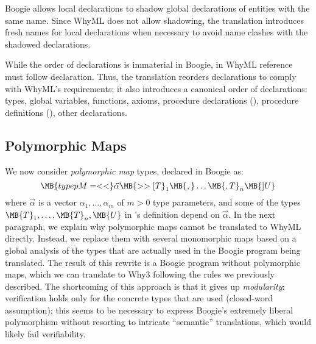 \documentclass[a4paper,final]{llncs}
\newcommand{\Boogie}{Boogie\xspace}
\newcommand{\WhyML}{WhyML\xspace}
\newcommand{\Why}{Why3\xspace}
\newcommand{\feature}[1]{\subsection{#1}}
\begin{document}
\Boogie allows local declarations to shadow global declarations of entities with the same name.
Since \WhyML does not allow shadowing, the translation introduces fresh names for local declarations when necessary to avoid name clashes with the shadowed declarations.

While the order of declarations is immaterial in \Boogie, in \WhyML reference must follow declaration.
Thus, the translation reorders declarations to comply with \WhyML's requirements; it also introduces a canonical order of declarations: types, global variables, functions, axioms, procedure declarations (), procedure definitions (), other declarations.

\fi



\feature{Polymorphic Maps} \label{sec:poly-maps-all}


We now consider \emph{polymorphic map} types, declared in \Boogie as:
\begin{equation}
\MB{type pM = <<}\vec{\alpha}\MB{>> [T}_1\MB{,} \ldots \MB{,T}_n\MB{] U}
\label{eq:def-poly-map}
\end{equation}
where $\vec{\alpha}$ is a vector $\alpha_1,\ldots,\alpha_m$ of $m > 0$ type parameters, and some of the types $\MB{T}_1, \ldots, \MB{T}_n, \MB{U}$ in 's definition depend on $\vec{\alpha}$. 
In the next paragraph, we explain why polymorphic maps cannot be translated to \WhyML directly.
Instead, we replace them with several monomorphic maps based on a global analysis of the types that are actually used in the \Boogie program being translated.
The result of this rewrite is a \Boogie program without polymorphic maps, which we can translate to \Why following the rules we previously described.
The shortcoming of this approach is that it gives up \emph{modularity}: verification holds only for the concrete types that are used (closed-word assumption); this seems to be necessary to express \Boogie's extremely liberal polymorphism without resorting to intricate ``semantic'' translations, which would likely fail verifiability.
\end{document}
